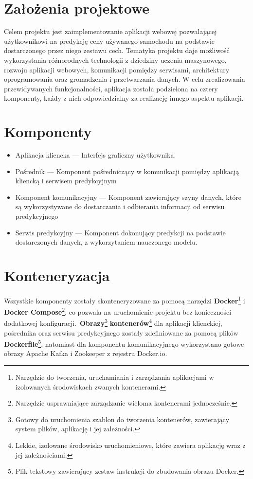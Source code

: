 \documentclass[12pt, a4paper]{report}
\begin{document}
\section{Założenia projektowe}
Celem projektu jest zaimplementowanie aplikacji webowej pozwalającej użytkownikowi na predykcję 
ceny używanego samochodu na podstawie dostarczonego przez niego zestawu cech. Tematyka projektu
daje możliwość wykorzystania różnorodnych technologii z dziedziny uczenia maszynowego, rozwoju
aplikacji webowych, komunikacji pomiędzy serwisami, architektury oprogramowania oraz gromadzenia i 
przetwarzania danych. W celu zrealizowania przewidywanych funkcjonalności, aplikacja została
podzielona na cztery komponenty, każdy z nich odpowiedzialny za realizację innego aspektu
aplikacji.
\section{Komponenty}
\begin{itemize}
    \item Aplikacja kliencka --- Interfejs graficzny użytkownika.
    \item Pośrednik --- Komponent pośredniczący w komunikacji pomiędzy aplikacją kliencką i serwisem predykcyjnym
    \item Komponent komunikacyjny --- Komponent zawierający szyny danych, które są wykorzystywane do dostarczania i odbierania informacji od serwisu predykcyjnego
    \item Serwis predykcyjny --- Komponent dokonujący predykcji na podstawie dostarczonych danych, z wykorzytaniem nauczonego modelu.
\end{itemize}

\section{Konteneryzacja}
Wszystkie komponenty zostały skonteneryzowane za pomocą narzędzi
\textbf{Docker}\footnote{Narzędzie do tworzenia, uruchamiania i zarządzania aplikacjami w izolowanych środowiskach zwanych kontenerami.}
i \textbf{Docker Compose}\footnote{Narzędzie usprawniające zarządzanie wieloma kontenerami jednocześnie.}, co pozwala na uruchomienie projektu
bez konieczności dodatkowej konfiguracji.\ \textbf{Obrazy}\footnote{Gotowy do uruchomienia szablon do tworzenia kontenerów, zawierający system plików, aplikację i jej zależności.}
\textbf{kontenerów}\footnote{Lekkie, izolowane środowisko uruchomieniowe, które zawiera aplikację wraz z jej zależnościami.}
dla aplikacji klienckiej, pośrednika oraz serwisu predykcyjnego zostały zdefiniowane za pomocą
plików \textbf{Dockerfile}\footnote{Plik tekstowy zawierający zestaw instrukcji do zbudowania obrazu Docker.},
natomiast dla komponentu komunikacyjnego wykorzystano gotowe obrazy Apache Kafka i Zookeeper z rejestru Docker.io.
\end{document}
